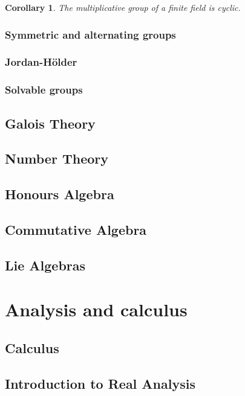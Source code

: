 \documentclass[12pt]{report}
\newtheorem{corollary}[theorem]{Corollary}
\theoremstyle{definition}
\begin{document}
\begin{corollary}
  The multiplicative group of a finite field is cyclic.
\end{corollary}

\section{Symmetric and alternating groups}
\section{Jordan-H\"older}
\section{Solvable groups}


\chapter{Galois Theory}\label{cha:galois-theory}

\chapter{Number Theory}\label{cha:intr-numb-theory}

\chapter{Honours Algebra}\label{cha:honours-algebra}

\chapter{Commutative Algebra}\label{cha:commutative-algebra}

\chapter{Lie Algebras}\label{cha:lie-algebras} \part{Analysis and calculus} \chapter{Calculus}\label{cha:calculus}
\chapter{Introduction to Real Analysis}\label{cha:intr-real-analys}
\end{document}
